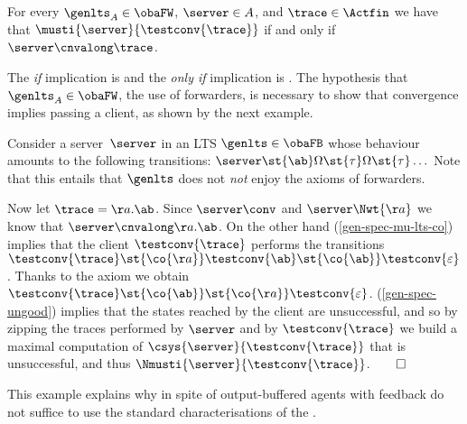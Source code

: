 \begin{proposition}%
  \label{prop:must-iff-acnv}
  For every $\genlts_{\States} \in \obaFW$,
  $\server \in \States$, and
  $\trace \in \Actfin$ we have that $\musti{\server}{ \testconv{ \trace} }$
  if and only if~$\server \cnvalong \trace$.
\end{proposition}
\noindent
The {\em if} implication is  and the {\em only if}
implication is .
\noindent
The hypothesis that $\genlts_{\States} \in \obaFW$,
\ie the use of forwarders, is necessary to show that convergence
implies passing a client, as shown by the next example.
\begin{example}
    \label{ex:forwarders-necessary}
    Consider a server~$\server$ in an LTS $\genlts \in \obaFB$
    whose behaviour amounts to the following transitions:
    $\server \st{ \ab } \Omega \st{ \tau }  \Omega \st{ \tau } \ldots$
    Note that this entails that $\genlts$ does not
    {\em not} enjoy the axioms of forwarders.

    Now let $ \trace = \aa.\ab $. Since $\server \conv$ and $\server
    \Nwt{\aa}$ we know that $ \server \cnvalong \aa.\ab$.
    On the other hand (\ref{gen-spec-mu-lts-co})
    implies that the client $\testconv{\trace}$ performs the transitions
    $\testconv{ \trace } \st{ \co{\aa}} \testconv{ \ab }  \st{ \co{\ab}} \testconv{ \varepsilon }$.
    Thanks to the \outputcommutativity axiom we obtain $\testconv{ \trace } \st{ \co{\ab}} \st{ \co{\aa}} \testconv{ \varepsilon }$.
    (\ref{gen-spec-ungood}) implies that the states
    reached by the client are unsuccessful, and so by zipping the traces performed
    by $\server$ and by $\testconv{\trace}$
    we build a maximal computation of
    $\csys{\server}{\testconv{\trace}}$ that is unsuccessful,
    and thus $\Nmusti{\server}{\testconv{\trace}}$.\hfill$\qed$
  \end{example}
  \noindent
  This example explains why in spite of 
  output-buffered agents with feedback do not suffice to use the
  standard characterisations of the \mustpreorder.



